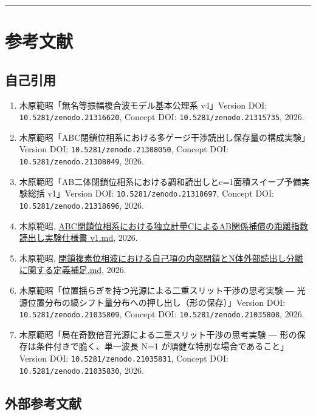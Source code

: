 \documentclass[
]{article}
\providecommand{\tightlist}{%
  \setlength{\itemsep}{0pt}\setlength{\parskip}{0pt}}
\begin{document}
\begin{center}\rule{0.5\linewidth}{0.5pt}\end{center}

\section{参考文献}\label{ux53c2ux8003ux6587ux732e}

\subsection{自己引用}\label{ux81eaux5df1ux5f15ux7528}

\begin{enumerate}
\def\labelenumi{\arabic{enumi}.}
\tightlist
\item
  木原範昭「無名等振幅複合波モデル基本公理系 v4」Version DOI:
  \texttt{10.5281/zenodo.21316620}, Concept DOI:
  \texttt{10.5281/zenodo.21315735}, 2026.
\item
  木原範昭「ABC閉鎖位相系における多ゲージ干渉読出し保存量の構成実験」Version
  DOI: \texttt{10.5281/zenodo.21308050}, Concept DOI:
  \texttt{10.5281/zenodo.21308049}, 2026.
\item
  木原範昭「AB二体閉鎖位相系における調和読出しとc=1面積スイープ予備実験総括
  v1」Version DOI: \texttt{10.5281/zenodo.21318697}, Concept DOI:
  \texttt{10.5281/zenodo.21318696}, 2026.
\item
  木原範昭,
  \href{ABC閉鎖位相系における独立計量CによるAB関係補償の距離指数読出し実験仕様書\%20v1.md}{ABC閉鎖位相系における独立計量CによるAB関係補償の距離指数読出し実験仕様書
  v1.md}, 2026.
\item
  木原範昭,
  \href{閉鎖複素位相波における自己項の内部閉鎖とN体外部読出し分離に関する定義補足.md}{閉鎖複素位相波における自己項の内部閉鎖とN体外部読出し分離に関する定義補足.md},
  2026.
\item
  木原範昭「位置揺らぎを持つ光源による二重スリット干渉の思考実験 ―
  光源位置分布の縞シフト量分布への押し出し（形の保存）」Version DOI:
  \texttt{10.5281/zenodo.21035809}, Concept DOI:
  \texttt{10.5281/zenodo.21035808}, 2026.
\item
  木原範昭「局在奇数倍音光源による二重スリット干渉の思考実験 ―
  形の保存は条件付きで脆く、単一波長 N=1
  が頑健な特別な場合であること」Version DOI:
  \texttt{10.5281/zenodo.21035831}, Concept DOI:
  \texttt{10.5281/zenodo.21035830}, 2026.
\end{enumerate}

\subsection{外部参考文献}\label{ux5916ux90e8ux53c2ux8003ux6587ux732e}
\end{document}
